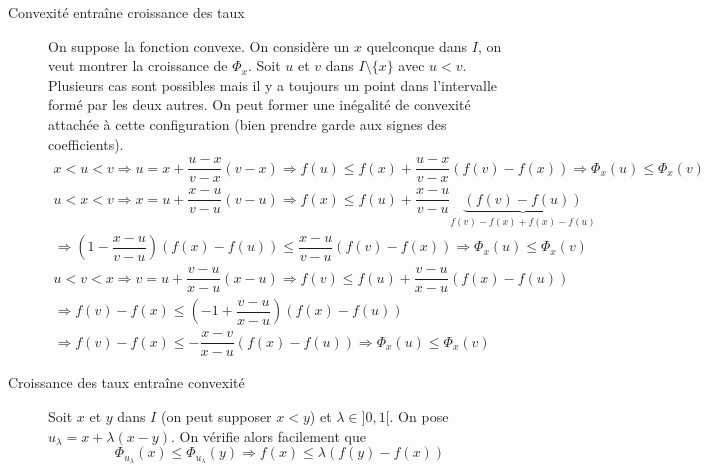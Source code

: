 \begin{demo}
 \begin{description}
   \item[Convexité entraîne croissance des taux] On suppose la fonction convexe. On considère un $x$ quelconque dans $I$, on veut montrer la croissance de $\Phi_x$. Soit $u$ et $v$ dans $I\setminus\{x\}$ avec $u<v$. Plusieurs cas sont possibles mais il y a toujours un point dans l'intervalle formé par les deux autres. On peut former une inégalité de convexité attachée à cette configuration (bien prendre garde aux signes des coefficients).
\begin{multline*}
 x<u<v \Rightarrow u=x+\dfrac{u-x}{v-x}(v-x) \Rightarrow
 f(u)\leq f(x)+\dfrac{u-x}{v-x}(f(v)-f(x)) \Rightarrow \Phi_x(u)\leq \Phi_x(v)
\end{multline*}
\begin{multline*}
 u<x<v \Rightarrow x=u+\dfrac{x-u}{v-u}(v-u) \Rightarrow
 f(x)\leq f(u)+\dfrac{x-u}{v-u}\underbrace{(f(v)-f(u))}_{f(v)-f(x)+f(x)-f(u)}\\
 \Rightarrow  \left(1-\dfrac{x-u}{v-u} \right)(f(x)-f(u))\leq \dfrac{x-u}{v-u}(f(v)-f(x)) \Rightarrow \Phi_x(u)\leq \Phi_x(v)
\end{multline*}
\begin{multline*}
 u<v<x \Rightarrow v=u+\dfrac{v-u}{x-u}(x-u) \Rightarrow
 f(v)\leq f(u)+\dfrac{v-u}{x-u}(f(x)-f(u)) \\ 
\Rightarrow f(v)-f(x)\leq \left( -1+\dfrac{v-u}{x-u}\right) (f(x)-f(u)) \\
\Rightarrow f(v)-f(x)\leq -\dfrac{x-v}{x-u} (f(x)-f(u))
\Rightarrow \Phi_x(u)\leq \Phi_x(v)
\end{multline*}

   \item[Croissance des taux entraîne convexité] Soit $x$ et $y$ dans $I$ (on peut supposer $x<y$) et $\lambda\in]0,1[$. On pose $u_\lambda = x +\lambda (x-y)$. On vérifie alors facilement que 
\begin{displaymath}
\Phi_{u_\lambda}(x)\leq \Phi_{u_\lambda}(y) \Rightarrow f(x) \leq \lambda (f(y)-f(x)) 
\end{displaymath}
 \end{description}
\end{demo}

